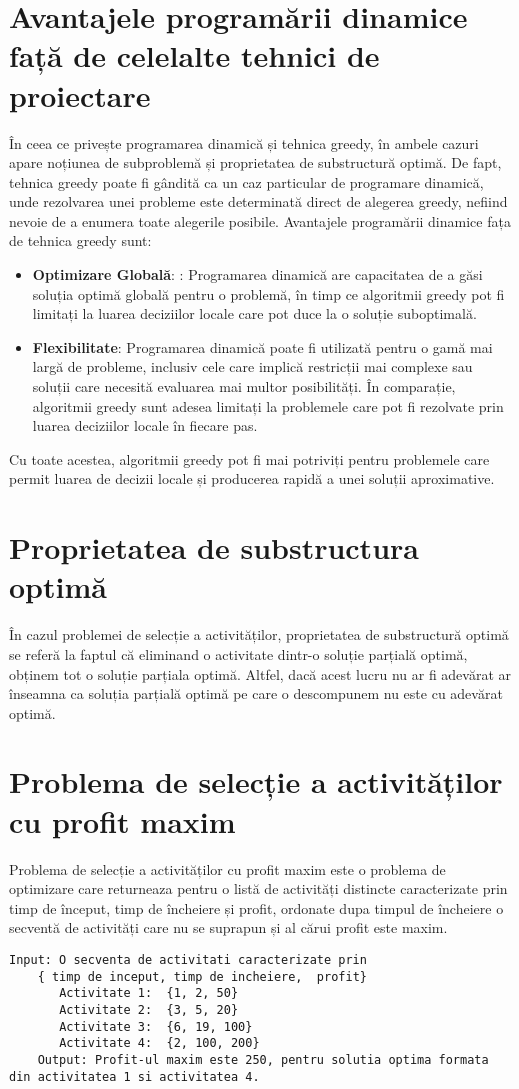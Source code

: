 \section{Avantajele programării dinamice față de celelalte tehnici de proiectare}
În ceea ce privește programarea dinamică și tehnica greedy, 
în ambele cazuri apare noțiunea de subproblemă și proprietatea de substructură optimă. De fapt, tehnica greedy poate fi gândită ca un caz particular de programare dinamică, unde rezolvarea unei probleme este determinată direct de alegerea greedy, nefiind nevoie de a
enumera toate alegerile posibile. Avantajele programării dinamice fața de tehnica greedy sunt:
\begin{itemize}
  \item \textbf {Optimizare Globală}: : Programarea dinamică are capacitatea de a găsi soluția optimă globală pentru o problemă, în timp ce algoritmii greedy pot fi limitați la luarea deciziilor locale care pot duce la o soluție suboptimală.
  \item \textbf {Flexibilitate}: Programarea dinamică poate fi utilizată pentru o gamă mai largă de probleme, inclusiv cele care implică restricții mai complexe sau soluții care necesită evaluarea mai multor posibilități. În comparație, algoritmii greedy sunt adesea limitați la problemele care pot fi rezolvate prin luarea deciziilor locale în fiecare pas.
  
\end{itemize}
Cu toate acestea, algoritmii greedy pot fi mai potriviți pentru problemele care permit luarea de decizii locale și producerea rapidă a unei soluții aproximative.
\section{Proprietatea de substructura optimă}
În cazul problemei de selecție a activităților, proprietatea de substructură optimă se referă la faptul că eliminand o activitate dintr-o soluție parțială optimă, obținem tot o soluție parțiala optimă. Altfel, dacă acest lucru nu ar fi adevărat ar înseamna ca soluția parțială optimă pe care o descompunem nu este cu adevărat optimă. 

\section{Problema de selecție a activităților cu profit maxim}
Problema de selecție a activităților cu profit maxim este o problema de optimizare care returneaza pentru o listă de activități distincte caracterizate prin timp de început, timp de încheiere și profit,  ordonate dupa timpul de încheiere o secventă de activități care nu se suprapun și al cărui profit este maxim. 
\begin{lstlisting}[numbers=None]
    Input: O secventa de activitati caracterizate prin
    { timp de inceput, timp de incheiere,  profit}
       Activitate 1:  {1, 2, 50} 
       Activitate 2:  {3, 5, 20}
       Activitate 3:  {6, 19, 100}
       Activitate 4:  {2, 100, 200}
    Output: Profit-ul maxim este 250, pentru solutia optima formata din activitatea 1 si activitatea 4.
\end{lstlisting}

